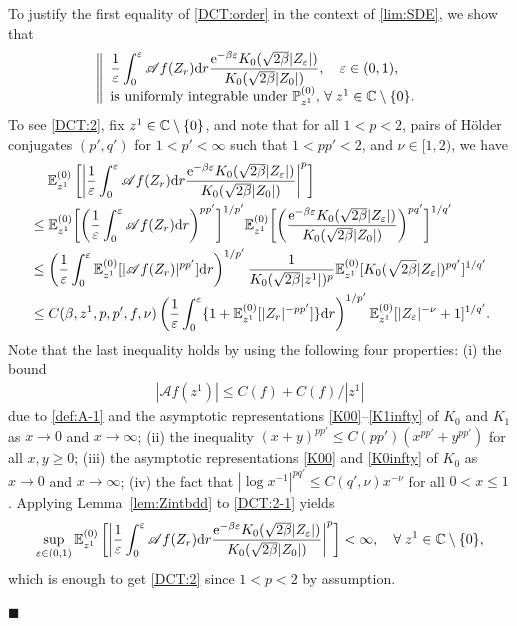\documentclass[12pt, twoside]{article}
\numberwithin{figure}{section}
\newcommand{\e}{{\mathrm e}}
\newcommand{\1}{\mathds 1}
\newcommand{\vep}{{\varepsilon}}
\newcommand{\ms}{\mathscr}
\renewcommand{\P}{{\mathbb P}}
\newcommand{\E}{{\mathbb E}}
\renewcommand{\d}{{\mathrm d}}
\newcommand{\2}{{\mathbf 1}}
\renewenvironment{proof}[1][\proofname]{\noindent {\bfseries #1.}\;}{\hfill\ensuremath{\blacksquare}\\}
\begin{document}
\begin{proof}[Proof of Proposition~\ref{prop:step2}]
To justify the first equality of \eqref{DCT:order} in the context of \eqref{lim:SDE}, we show that 
\begin{align}
\left\|
\begin{array}{ll}\label{DCT:2}
\displaystyle \frac{1}{\vep}\int_0^\vep \ms A f(Z_r)\d r\frac{\e^{-\beta\vep}K_0(\sqrt{2\beta}|Z_\vep|)}{K_0(\sqrt{2\beta}|Z_0|)},\quad \vep\in (0,1),\\
\displaystyle\mbox{is uniformly integrable under $\P^{(0)}_{z^1}$, $\forall\; z^1\in\Bbb C\setminus\{0\}$}.
\end{array}
\right.
\end{align}
To see \eqref{DCT:2}, fix $z^1\in \Bbb C\setminus\{0\}$, and note that for all $1< p<2$, pairs of H\"older conjugates $(p',q')$ for $1<p'<\infty$ such that $1< pp'<2$, and $\nu\in [1,2)$, we have
\begin{align}
&\quad\;\E^{(0)}_{z^1}\left[\left|\frac{1}{\vep}\int_0^\vep \ms A f(Z_r)\d r\frac{\e^{-\beta\vep}K_0(\sqrt{2\beta}|Z_\vep|)}{K_0(\sqrt{2\beta}|Z_0|)}\right|^p\right]\notag\\
&\leq\E^{(0)}_{z^1}\biggl[\biggl(\frac{1}{\vep}\int_0^\vep \ms A f(Z_r)\d r\biggr)^{pp'}\biggr]^{1/p'}
\E^{(0)}_{z^1}\biggl[\biggl(\frac{\e^{-\beta\vep}K_0(\sqrt{2\beta}|Z_\vep|)}{K_0(\sqrt{2\beta}|Z_0|)}\biggr)^{pq'}
\biggr]^{1/q'}\notag\\
&\leq\left(\frac{1}{\vep}\int_0^\vep \E^{(0)}_{z^1}[|\ms A f(Z_r)|^{pp'}]\d r
 \right)^{1/p'}\frac{1}{K_0(\sqrt{2\beta}|z^1|)^p}\E^{(0)}_{z^1}[K_0(\sqrt{2\beta}|Z_\vep|)^{pq'}]^{1/q'}\notag\\
&\leq C(\beta,z^1,p,p',f,\nu)\left(\frac{1}{\vep}\int_0^\vep \{ 1+\E^{(0)}_{z^1}[|Z_r|^{-pp'}]\}\d r
 \right)^{1/p'}\E^{(0)}_{z^1}[|Z_\vep|^{-\nu}+1]^{1/q'}.\label{DCT:2-1}
\end{align}
Note that the last inequality holds by using the following four properties: (i) the bound 
\begin{align}\label{Af:bdd}
|\ms Af(z^1)|\leq C(f)+C(f)/|z^1|
\end{align}
due to \eqref{def:A-1} and the asymptotic representations \eqref{K00}--\eqref{K1infty} of $K_0$ and $K_1$ as $x\to 0$ and $x\to\infty$; (ii) the inequality $(x+y)^{pp'}\leq C(pp')(x^{pp'}+y^{pp'})$ for all $x,y\geq 0$; (iii) the asymptotic representations \eqref{K00} and \eqref{K0infty} of $K_0$ as $x\to 0$ and $x\to\infty$; (iv) the fact that $|\log x^{-1}|^{pq'}\leq C(q',\nu)x^{-\nu}$ for all $0<x\leq 1$. Applying Lemma~\ref{lem:Zintbdd} to \eqref{DCT:2-1} yields
\[
\sup_{\vep\in (0,1)}\E^{(0)}_{z^1}\left[\left|\frac{1}{\vep}\int_0^\vep \ms A f(Z_r)\d r\frac{\e^{-\beta\vep}K_0(\sqrt{2\beta}|Z_\vep|)}{K_0(\sqrt{2\beta}|Z_0|)}\right|^p\right]<\infty,\quad \forall\;z^1\in \Bbb C\setminus\{0\},
\]
which is enough to get \eqref{DCT:2} since $1<p<2$ by assumption. 


\end{proof}
\end{document}
